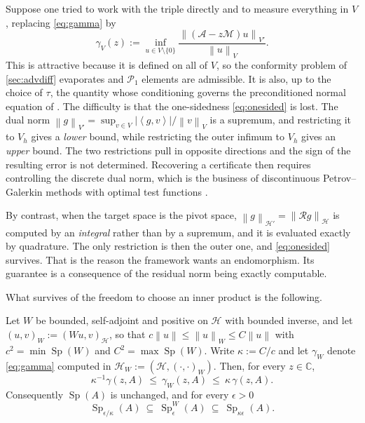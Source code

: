 \documentclass[11pt,a4paper]{article}
\theoremstyle{plain}
\newcommand{\C}{\mathbb{C}}
\newcommand{\norm}[1]{\left\|#1\right\|}
\newcommand{\abs}[1]{\left|#1\right|}
\newcommand{\dual}[2]{\left\langle #1, #2 \right\rangle}
\newcommand{\Hb}{\mathcal{H}}
\newcommand{\Vb}{V}
\newcommand{\Aop}{\mathcal{A}}
\DeclareMathOperator{\Sp}{Sp}
\newcommand{\Riesz}{\mathcal{R}}         %
\newcommand{\Mass}{\mathcal{M}}          %
\begin{document}
Suppose one tried to work with the triple directly and to measure everything in
$\Vb$, replacing \cref{eq:gamma} by
\begin{equation}
  \label{eq:gammaV}
  \gamma_{\Vb}(z) := \inf_{u \in \Vb\setminus\{0\}}
    \frac{\norm{(\Aop - z\Mass)u}_{\Vb'}}{\norm{u}_{\Vb}} .
\end{equation}
This is attractive because it is defined on all of $\Vb$, so the conformity
problem of \cref{sec:advdiff} evaporates and $\mathcal{P}_1$ elements are
admissible.  It is also, up to the choice of $\tau$, the quantity whose
conditioning governs the preconditioned normal equation of
\cite{LazzarinoNakatsukasaZerbinati2026}.
The difficulty is that the one-sidedness \cref{eq:onesided} is lost.  The dual
norm $\norm{g}_{\Vb'} = \sup_{v\in \Vb} \abs{\dual{g}{v}}/\norm{v}_{\Vb}$ is a
supremum, and restricting it to $V_h$ gives a \emph{lower} bound, while
restricting the outer infimum to $V_h$ gives an \emph{upper} bound.  The two
restrictions pull in opposite directions and the sign of the resulting error is
not determined.  Recovering a certificate then requires controlling the discrete
dual norm, which is the business of discontinuous Petrov--Galerkin methods with
optimal test functions \cite{DemkowiczGopalakrishnan2011}.

By contrast, when the target space is the pivot space, $\norm{g}_{\Hb'} =
\norm{\Riesz g}_{\Hb}$ is computed by an \emph{integral} rather than by a
supremum, and it is evaluated exactly by quadrature.  The only restriction is
then the outer one, and \cref{eq:onesided} survives.  That is the reason the
framework wants an endomorphism.  Its guarantee is a consequence of the residual
norm being exactly computable.

What survives of the freedom to choose an inner product is the following.

\begin{proposition}
  \label{prop:reweight}
  Let $W$ be bounded, self-adjoint and positive on $\Hb$ with bounded inverse,
  and let $(u,v)_W := (Wu,v)_{\Hb}$, so that $c\norm{u} \le \norm{u}_W \le
  C\norm{u}$ with $c^2 = \min\Sp(W)$ and $C^2 = \max\Sp(W)$.  Write $\kappa :=
  C/c$ and let $\gamma_W$ denote \cref{eq:gamma} computed in $\Hb_W := (\Hb,
  (\cdot,\cdot)_W)$.  Then, for every $z \in \C$,
  \begin{equation}
    \label{eq:reweight}
    \kappa^{-1}\gamma(z,A) \ \le\ \gamma_W(z,A) \ \le\ \kappa\,\gamma(z,A) .
  \end{equation}
  Consequently $\Sp(A)$ is unchanged, and for every $\epsilon > 0$
  \begin{equation}
    \label{eq:sandwich}
    \Sp_{\epsilon/\kappa}(A) \ \subseteq\ \Sp^W_\epsilon(A)
      \ \subseteq\ \Sp_{\kappa\epsilon}(A) .
  \end{equation}
\end{proposition}
\end{document}
